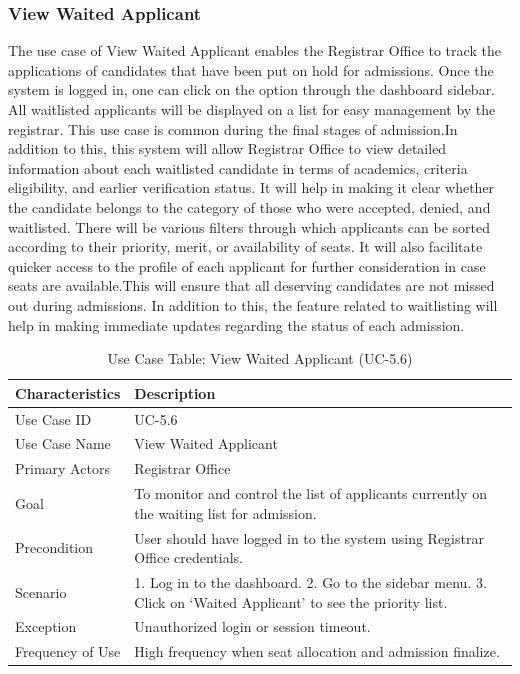 \subsubsection{View Waited Applicant}
The use case of View Waited Applicant enables the Registrar Office to track the applications of candidates that have been put on hold for admissions. Once the system is logged in, one can click on the option through the dashboard sidebar. All waitlisted applicants will be displayed on a list for easy management by the registrar. This use case is common during the final stages of admission.In addition to this, this system will allow Registrar Office to view detailed information about each waitlisted candidate in terms of academics, criteria eligibility, and earlier verification status. It will help in making it clear whether the candidate belongs to the category of those who were accepted, denied, and waitlisted. There will be various filters through which applicants can be sorted according to their priority, merit, or availability of seats. It will also facilitate quicker access to the profile of each applicant for further consideration in case seats are available.This will ensure that all deserving candidates are not missed out during admissions. In addition to this, the feature related to waitlisting will help in making immediate updates regarding the status of each admission. 
\begin{table}[H]
    \centering
    \small
    \renewcommand{\arraystretch}{1.4}
    \caption{Use Case Table: View Waited Applicant (UC-5.6)} %
    \label{tab:view-waited-applicant-registrar}
    \begin{tabularx}{\textwidth}{|l|X|}
        \hline
        \rowcolor[gray]{0.9} {Characteristics} & {Description} \\ \hline
        Use Case ID & UC-5.6 \\ \hline
        Use Case Name & View Waited Applicant \\ \hline
        Primary Actors & Registrar Office \\ \hline
        Goal & To monitor and control the list of applicants currently on the waiting list for admission. \\ \hline
        Precondition & User should have logged in to the system using Registrar Office credentials. \\ \hline
        Scenario & 1. Log in to the dashboard. 2. Go to the sidebar menu. 3. Click on ‘Waited Applicant’ to see the priority list. \\ \hline
        Exception & Unauthorized login or session timeout. \\ \hline
        Frequency of Use & High frequency when seat allocation and admission finalize. \\ \hline
    \end{tabularx}
\end{table}
\FloatBarrier
